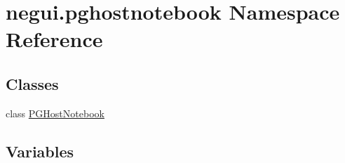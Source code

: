 \hypertarget{namespacenegui_1_1pghostnotebook}{}\section{negui.\+pghostnotebook Namespace Reference}
\label{namespacenegui_1_1pghostnotebook}
\subsection*{Classes}
\begin{DoxyCompactItemize}
\item 
class \hyperlink{classnegui_1_1pghostnotebook_1_1PGHostNotebook}{P\+G\+Host\+Notebook}
\end{DoxyCompactItemize}
\subsection*{Variables}
